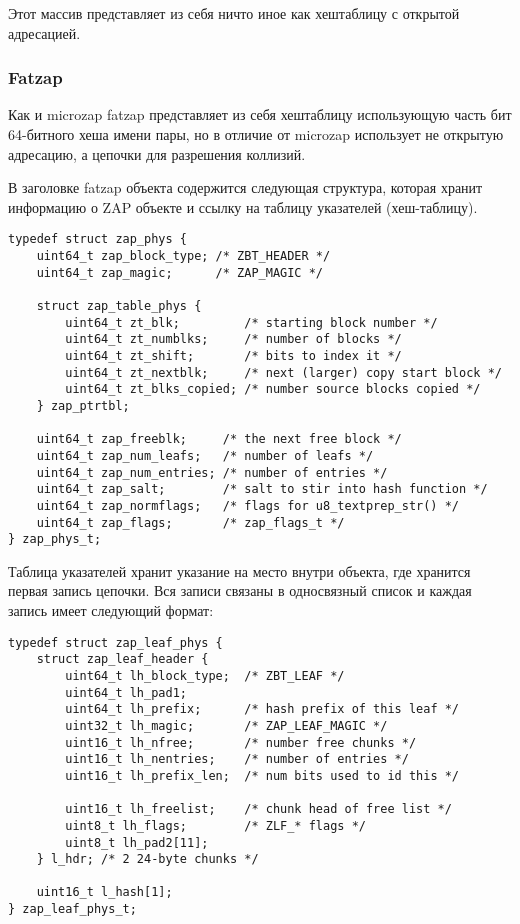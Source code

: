 Этот массив представляет из себя ничто иное как хештаблицу с открытой
адресацией.

\subsubsection{Fatzap}

Как и microzap fatzap представляет из себя хештаблицу использующую часть бит
64-битного хеша имени пары, но в отличие от microzap использует не открытую
адресацию, а цепочки для разрешения коллизий.

В заголовке fatzap объекта содержится следующая структура, которая хранит
информацию о ZAP объекте и ссылку на таблицу указателей (хеш-таблицу).
\begin{lstlisting}
typedef struct zap_phys {
    uint64_t zap_block_type; /* ZBT_HEADER */
    uint64_t zap_magic;      /* ZAP_MAGIC */

    struct zap_table_phys {
        uint64_t zt_blk;         /* starting block number */
        uint64_t zt_numblks;     /* number of blocks */
        uint64_t zt_shift;       /* bits to index it */
        uint64_t zt_nextblk;     /* next (larger) copy start block */
        uint64_t zt_blks_copied; /* number source blocks copied */
    } zap_ptrtbl;

    uint64_t zap_freeblk;     /* the next free block */
    uint64_t zap_num_leafs;   /* number of leafs */
    uint64_t zap_num_entries; /* number of entries */
    uint64_t zap_salt;        /* salt to stir into hash function */
    uint64_t zap_normflags;   /* flags for u8_textprep_str() */
    uint64_t zap_flags;       /* zap_flags_t */
} zap_phys_t;
\end{lstlisting}

Таблица указателей хранит указание на место внутри объекта, где хранится первая
запись цепочки. Вся записи связаны в односвязный список и каждая запись имеет
следующий формат:

\begin{lstlisting}
typedef struct zap_leaf_phys {
    struct zap_leaf_header {
        uint64_t lh_block_type;  /* ZBT_LEAF */
        uint64_t lh_pad1;
        uint64_t lh_prefix;      /* hash prefix of this leaf */
        uint32_t lh_magic;       /* ZAP_LEAF_MAGIC */
        uint16_t lh_nfree;       /* number free chunks */
        uint16_t lh_nentries;    /* number of entries */
        uint16_t lh_prefix_len;  /* num bits used to id this */

        uint16_t lh_freelist;    /* chunk head of free list */
        uint8_t lh_flags;        /* ZLF_* flags */
        uint8_t lh_pad2[11];
    } l_hdr; /* 2 24-byte chunks */

    uint16_t l_hash[1];
} zap_leaf_phys_t;
\end{lstlisting}

